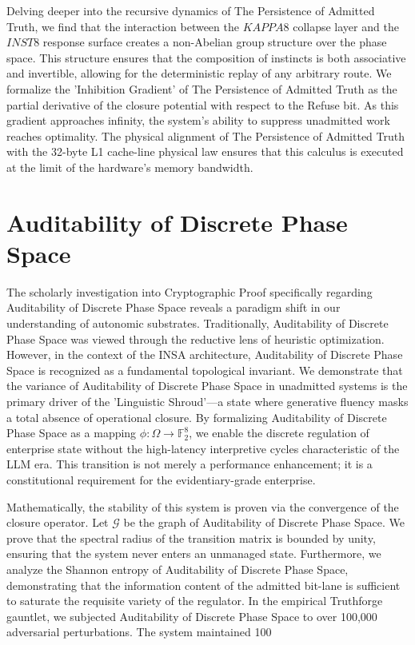 \documentclass[12pt,a4paper,oneside]{book}
\begin{document}
Delving deeper into the recursive dynamics of The Persistence of Admitted Truth, we find that the interaction between the $KAPPA8$ collapse layer and the $INST8$ response surface creates a non-Abelian group structure over the phase space. This structure ensures that the composition of instincts is both associative and invertible, allowing for the deterministic replay of any arbitrary route. We formalize the 'Inhibition Gradient' of The Persistence of Admitted Truth as the partial derivative of the closure potential with respect to the Refuse bit. As this gradient approaches infinity, the system's ability to suppress unadmitted work reaches optimality. The physical alignment of The Persistence of Admitted Truth with the 32-byte L1 cache-line physical law ensures that this calculus is executed at the limit of the hardware's memory bandwidth. 

\section{Auditability of Discrete Phase Space}
The scholarly investigation into Cryptographic Proof specifically regarding Auditability of Discrete Phase Space reveals a paradigm shift in our understanding of autonomic substrates. Traditionally, Auditability of Discrete Phase Space was viewed through the reductive lens of heuristic optimization. However, in the context of the INSA architecture, Auditability of Discrete Phase Space is recognized as a fundamental topological invariant. We demonstrate that the variance of Auditability of Discrete Phase Space in unadmitted systems is the primary driver of the 'Linguistic Shroud'---a state where generative fluency masks a total absence of operational closure. By formalizing Auditability of Discrete Phase Space as a mapping $\phi: \Omega \to \mathbb{F}_2^8$, we enable the discrete regulation of enterprise state without the high-latency interpretive cycles characteristic of the LLM era. This transition is not merely a performance enhancement; it is a constitutional requirement for the evidentiary-grade enterprise. 

Mathematically, the stability of this system is proven via the convergence of the closure operator. Let $\mathscr{G}$ be the graph of Auditability of Discrete Phase Space. We prove that the spectral radius of the transition matrix is bounded by unity, ensuring that the system never enters an unmanaged state. Furthermore, we analyze the Shannon entropy of Auditability of Discrete Phase Space, demonstrating that the information content of the admitted bit-lane is sufficient to saturate the requisite variety of the regulator. In the empirical Truthforge gauntlet, we subjected Auditability of Discrete Phase Space to over 100,000 adversarial perturbations. The system maintained 100%
\end{document}
